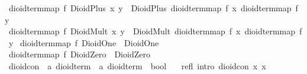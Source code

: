 \begin{isabellebody}
{}\ {}dioid{}term{}map\ f\ {}DioidPlus\ x\ y{}\ {}\ DioidPlus\ {}dioid{}term{}map\ f\ x{}\ {}dioid{}term{}map\ f\ y{}{}\isanewline
{}\ {}dioid{}term{}map\ f\ {}DioidMult\ x\ y{}\ {}\ DioidMult\ {}dioid{}term{}map\ f\ x{}\ {}dioid{}term{}map\ f\ y{}{}\isanewline
{}\ {}dioid{}term{}map\ f\ DioidOne\ {}\ DioidOne{}\isanewline
{}\ {}dioid{}term{}map\ f\ DioidZero\ {}\ DioidZero{}\isanewline
\isanewline
{}\isamarkupfalse%
\ dioid{}con\ {}{}\ {}{}a\ dioid{}term\ {}\ {}a\ dioid{}term\ {}\ bool{}\ \isanewline
\ \ refl\ {}intro{}{}\ {}dioid{}con\ x\ x{}\isanewline

\end{isabellebody}
